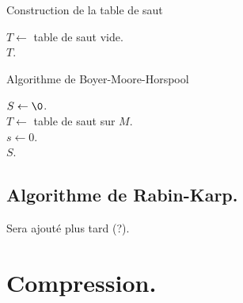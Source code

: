 \documentclass[french, 11pt]{article}
\begin{document}
\begin{defi}{}{}
    \begin{algorithm}[H]
        \caption{Construction de la table de saut}
        $T \gets $ table de saut vide.\\
        \Retour $T$.
    \end{algorithm}

    \begin{algorithm}[H]
        \caption{Algorithme de Boyer-Moore-Horspool}
        $S \gets \0$.\\
        $T \gets $ table de saut sur $M$.\\
        $s \gets 0$.\\
        \Retour $S$.
    \end{algorithm}
\end{defi}

\subsection{Algorithme de Rabin-Karp.}

\begin{center}
    Sera ajouté plus tard (?).
\end{center}

\pagebreak

\section{Compression.}
\end{document}
